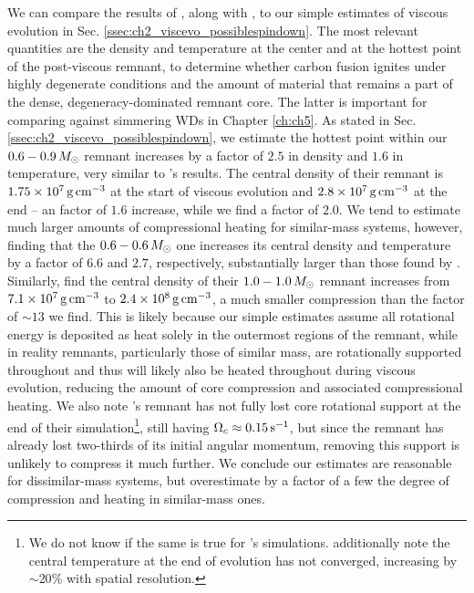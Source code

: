 We can compare the results of \cite{ji+13}, along with \cite{schw+12}, to our simple estimates of viscous evolution in Sec. \ref{ssec:ch2_viscevo_possiblespindown}.  The most relevant quantities are the density and temperature at the center and at the hottest point of the post-viscous remnant, to determine whether carbon fusion ignites under highly degenerate conditions and the amount of material that remains a part of the dense, degeneracy-dominated remnant core.  The latter is important for comparing against simmering WDs in Chapter \ref{ch:ch5}.  As stated in Sec. \ref{ssec:ch2_viscevo_possiblespindown}, we estimate the hottest point within our $0.6-0.9\,\Msun$ remnant increases by a factor of $2.5$ in density and $1.6$ in temperature, very similar to \cite{schw+12}'s results.  The central density of their remnant is $1.75\times10^7\,\gcc$ at the start of viscous evolution \citep{dan+11} and $2.8\times10^7\,\gcc$ at the end -- an factor of $1.6$ increase, while we find a factor of $2.0$.  We tend to estimate much larger amounts of compressional heating for similar-mass systems, however, finding that the $0.6 - 0.6\,\Msun$ one increases its central density and temperature by a factor of $6.6$ and $2.7$, respectively, substantially larger than those found by \cite{ji+13}.  Similarly, \cite{rask+14} find the central density of their $1.0-1.0\,\Msun$ remnant increases from $7.1\times10^7\,\gcc$ to $2.4\times10^8\,\gcc$, a much smaller compression than the factor of $\sim13$ we find.  This is likely because our simple estimates assume all rotational energy is deposited as heat solely in the outermost regions of the remnant, while in reality remnants, particularly those of similar mass, are rotationally supported throughout and thus will likely also be heated throughout during viscous evolution, reducing the amount of core compression and associated compressional heating.  We also note \cite{ji+13}'s remnant has not fully lost core rotational support at the end of their simulation\footnote{We do not know if the same is true for \cite{rask+14}'s simulations.  \cite{ji+13} additionally note the central temperature at the end of evolution has not converged, increasing by $\sim20$\% with spatial resolution.}, still having $\Omegac \approx 0.15\,\psec$, {\charles but since the remnant has already lost two-thirds of its initial angular momentum, removing this support is unlikely to compress it much further.}  We conclude our estimates are reasonable for dissimilar-mass systems, but overestimate by a factor of a few the degree of compression and heating in similar-mass ones.

